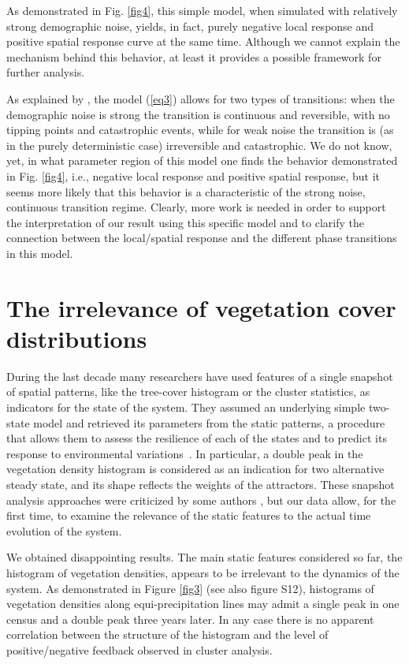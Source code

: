 \documentclass[aps,pre,twocolumn]{revtex4-1}
\begin{document}
As demonstrated in Fig.  \ref{fig4}, this simple model, when simulated with relatively strong demographic noise, yields, in fact, purely negative local response and positive spatial response curve at the same time. Although we cannot explain the mechanism behind this behavior, at least it provides a possible framework for further analysis.

 As explained by \cite{martin2015eluding}, the model (\ref{eq3}) allows for two types of transitions: when the demographic noise is strong the transition is continuous and reversible, with no tipping points and catastrophic events, while for weak noise the transition is (as in the purely deterministic case) irreversible and catastrophic.  We do not know, yet, in what parameter region of this model one finds  the behavior demonstrated in Fig. \ref{fig4}, i.e., negative local response and positive spatial response, but it seems  more likely  that this behavior is a characteristic of the strong noise, continuous transition regime.  Clearly, more work is needed in order  to support the interpretation of our result using this specific model and  to clarify the connection between the local/spatial response and the different phase transitions in this model.


\section{The irrelevance of vegetation cover distributions}


  During the last decade many researchers have used features of a single snapshot of  spatial patterns, like the tree-cover histogram or the cluster statistics, as indicators for the state of the system. They assumed an underlying simple two-state model and retrieved its parameters from the static patterns, a procedure that allows them to assess the resilience of each of the states and to predict its response to environmental variations~\cite{hirota2011global,staal2015synergistic,berdugo2017plant}. In particular, a double peak in the vegetation density histogram is considered as an indication for two alternative steady state, and its shape reflects the weights of the attractors.  These snapshot analysis approaches were criticized by some authors \cite{ratajczak2012comment,ratajczak2014abrupt,staver2011global,hanan2014analysis}, but our data allow, for the first time,  to examine the relevance of the static features to the actual time evolution of the system.

 We obtained disappointing results.  The main static features considered so far,  the histogram of vegetation densities, appears to be irrelevant  to the dynamics of the system. As demonstrated in Figure \ref{fig3} (see also figure S12), histograms of vegetation densities along equi-precipitation lines may admit a single peak in one census and a double peak three years later. In any case there is no apparent correlation between the structure of the histogram and the level of positive/negative feedback observed in cluster analysis.
\end{document}
